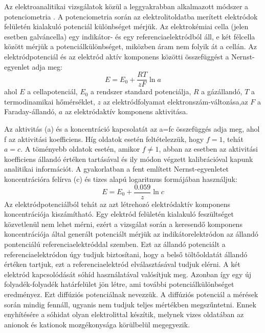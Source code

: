 Az elektroanalitikai vizsgálatok közül a leggyakrabban alkalmazott módszer a potenciometria \cite{erdey1967}. A potenciometria során az elektrolitoldatba merített elektródok felületén kialakuló potenciál különbséget mérjük. Az elektrokémiai cella (jelen esetben galváncella) egy indikátor- és egy referenciaelektródból áll, e két félcella között mérjük a potenciálkülönbséget, miközben áram nem folyik át a cellán. Az elektródpotenciál és az elektród aktív komponens közötti összefüggést a Nernst-egyenlet adja meg:
\begin{equation}
E = E_\text{0} + \frac{RT}{zF} \ln a
\end{equation}
ahol $E$ a cellapotenciál, $E_\text{0}$ a rendszer standard potenciálja, $R$ a gázállandó, $T$ a termodinamikai hőmérséklet, $z$ az elektródfolyamat elektronszám-változása,az $F$ a Faraday-állandó, $a$ az elektródaktív komponens aktivitása.

Az aktivitás (a) és a koncentráció kapcsolatát az a=fc összefüggés adja meg, ahol f az aktivitási koefficiens. Híg oldatok esetén feltételezzük, hogy $f=1$, tehát $a=c$. A töményebb oldatok esetén, amikor $f\neq 1$, abban az esetben az aktivitási koefficiens állandó értéken tartásával és ily módon végzett kalibrációval kapunk analitikai információt. A gyakorlatban a fent említett Nernst-egyenletet koncentrációra felírva (c) és tizes alapú logaritmus formájában használjuk:
\begin{equation}
E= E_\text{0} + \frac{0.059}{z} \ln c
\end{equation}
Az elektródpotenciálból tehát az azt létrehozó elektródaktív komponens koncentrációja kiszámítható. Egy elektród felületén kialakuló feszültséget közvetlenül nem lehet mérni, ezért a vizsgálat során a keresendő komponens koncentrációja által generált potenciált mérjük az indikátorelektródon az állandó pontenciálú referenciaelektróddal szemben. Ezt az állandó potenciált a referenciaelektródon úgy tudjuk biztosítani, hogy a belső töltőoldatát állandó értéken tartjuk, ezt a referenciaelektród elválasztásával tudjuk elérni. A két elektród kapcsolódását sóhíd használatával valósítjuk meg. Azonban így egy új folyadék-folyadék határfelület jön létre, ami további potenciálkülönbséget eredményez. Ezt diffúziós potenciálnak nevezzük. A diffúziós potenciál a mérések során mindig fennáll, ugyanis nem tudjuk teljes mértékben megszűntetni. Ennek enyhítésére a sóhidat olyan elektrolittal készítik, melynek vizes oldatában az anionok és kationok mozgékonysága körülbelül megegyezik.

